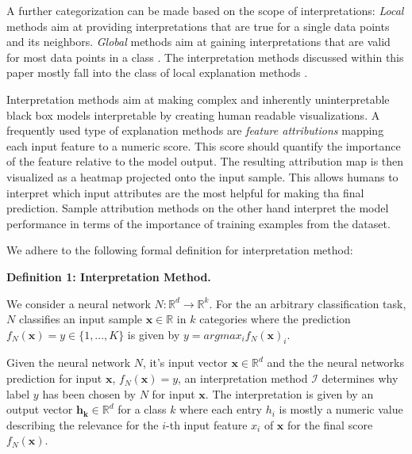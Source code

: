  A further categorization can be made based on the scope of interpretations: \textit{Local} methods aim at providing interpretations that are true for a single data points and its neighbors. 
\textit{Global} methods aim at gaining interpretations that are valid for most data points in a class \cite{kim2018interpretability, nguyen2017plug, yosinski2015understanding}. The interpretation methods discussed within this paper mostly fall into the class of local explanation methods \cite{ribeiro2016should, lundberg2017unified, bach2015pixel}. %

 Interpretation methods aim at making complex and inherently uninterpretable black box models interpretable by creating human readable visualizations. 
A frequently used type of explanation methods are \textit{feature attributions} mapping each input feature to a numeric score. This score should quantify the importance of the feature relative to the model output. The resulting attribution map is then visualized as a heatmap projected onto the input sample. This allows humans to interpret which input attributes are the most helpful for making tha final prediction. Sample attribution methods on the other hand interpret the model performance in terms of the importance of training examples from the dataset. 

We adhere to the following formal definition for interpretation method:\newline

\textbf{Definition 1: Interpretation Method.}

\setlength{\leftskip}{0.39cm}

  \noindent We consider a neural network $N: \mathbb{R}^d \to \mathbb{R}^k$. For the an arbitrary classification task, $N$ classifies an input sample $\mathbf{x}\in \mathbb{R}$ in $k$ categories where the prediction $f_N(\mathbf{x})=y \in \{1, ..., K\}$ is given by $y = arg max_i f_N(\mathbf{x})_i$.

  Given the neural network $N$, it's input vector $\mathbf{x} \in \mathbb{R}^d$ and the the neural networks prediction for input $\mathbf{x}$, $f_N(\mathbf{x})=y$, an interpretation method $\mathcal{I}$ determines why label $y$ has been chosen by $N$ for input $\mathbf{x}$. 
  The interpretation is given by an output vector $\mathbf{h_k} \in \mathbb{R}^d$ for a class $k$ where each entry $h_i$ is mostly a numeric value describing the relevance for the $i$-th input feature $x_i$ of $\mathbf{x}$ for the final score $f_N(\mathbf{x})$.

